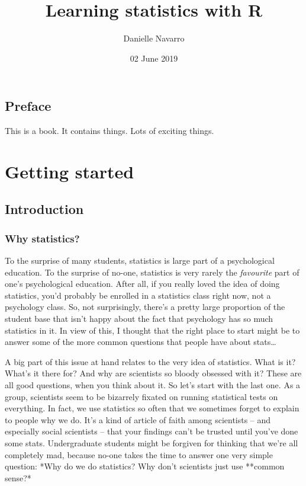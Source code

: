\documentclass[]{book}
\title{Learning statistics with R}
\author{Danielle Navarro}
\date{02 June 2019}
\begin{document}
\maketitle

{
\setcounter{tocdepth}{1}
\tableofcontents
}
\hypertarget{preface}{%
\chapter*{Preface}\label{preface}}

This is a book. It contains things. Lots of exciting things.

\hypertarget{part-getting-started}{%
\part{Getting started}\label{part-getting-started}}

\hypertarget{intro}{%
\chapter{Introduction}\label{intro}}

\hypertarget{whywhywhy}{%
\section{Why statistics?}\label{whywhywhy}}

To the surprise of many students, statistics is large part of a psychological education. To the surprise of no-one, statistics is very rarely the \emph{favourite} part of one's psychological education. After all, if you really loved the idea of doing statistics, you'd probably be enrolled in a statistics class right now, not a psychology class. So, not surprisingly, there's a pretty large proportion of the student base that isn't happy about the fact that psychology has so much statistics in it. In view of this, I thought that the right place to start might be to answer some of the more common questions that people have about stats\ldots{}

A big part of this issue at hand relates to the very idea of statistics. What is it? What's it there for? And why are scientists so bloody obsessed with it? These are all good questions, when you think about it. So let's start with the last one. As a group, scientists seem to be bizarrely fixated on running statistical tests on everything. In fact, we use statistics so often that we sometimes forget to explain to people why we do. It's a kind of article of faith among scientists -- and especially social scientists -- that your findings can't be trusted until you've done some stats. Undergraduate students might be forgiven for thinking that we're all completely mad, because no-one takes the time to answer one very simple question: *Why do we do statistics? Why don't scientists just use **common sense?*
\end{document}
